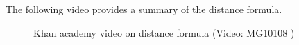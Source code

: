         \label{m39107*eip-130}The following video provides a summary of the distance formula.
    \setcounter{subfigure}{0}
	\begin{figure}[H] %
    \textnormal{Khan academy video on distance formula}\vspace{.1in} \nopagebreak
  \label{m39107*yt-media}\label{m39107*yt-video}
             { (Video:  MG10108 )}
      \vspace{2pt}
    \vspace{.1in}
 \end{figure}       \par 
      \label{m39107**end}
%     
%     
%     
      \label{m39108*uid40}
